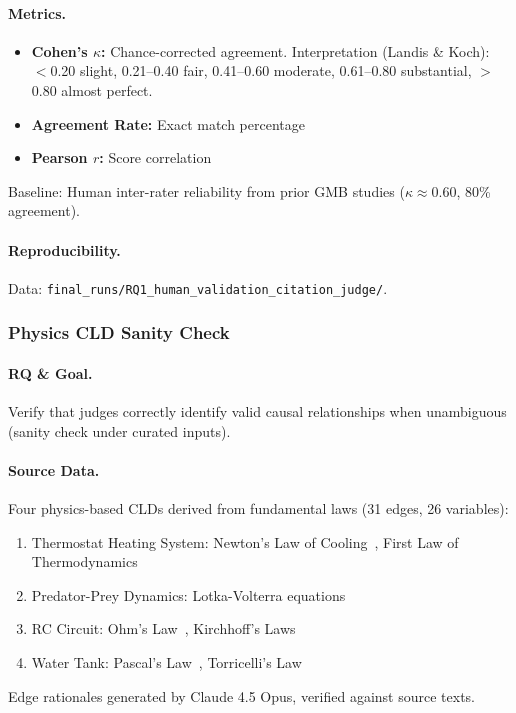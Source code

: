 \paragraph{Metrics.}
\begin{itemize}[noitemsep]
    \item \textbf{Cohen's $\kappa$:} Chance-corrected agreement. Interpretation (Landis \& Koch): $<$0.20 slight, 0.21--0.40 fair, 0.41--0.60 moderate, 0.61--0.80 substantial, $>$0.80 almost perfect.
    \item \textbf{Agreement Rate:} Exact match percentage
    \item \textbf{Pearson $r$:} Score correlation
\end{itemize}
Baseline: Human inter-rater reliability from prior GMB studies ($\kappa \approx 0.60$, 80\% agreement).

\paragraph{Reproducibility.}
Data: \texttt{final\_runs/RQ1\_human\_validation\_citation\_judge/}.

\subsubsection{Physics CLD Sanity Check}
\label{sec:physics_validation}

\paragraph{RQ \& Goal.}
Verify that judges correctly identify valid causal relationships when unambiguous (sanity check under curated inputs).

\paragraph{Source Data.}
Four physics-based CLDs derived from fundamental laws (31 edges, 26 variables):
\begin{enumerate}[noitemsep]
    \item Thermostat Heating System: Newton's Law of Cooling~\cite{newton1701scala}, First Law of Thermodynamics~\cite{clausius1850heat}
    \item Predator-Prey Dynamics: Lotka-Volterra equations~\cite{lotka1925elements,volterra1928fluctuations}
    \item RC Circuit: Ohm's Law~\cite{ohm1827galvanische}, Kirchhoff's Laws~\cite{kirchhoff1845durchgang}
    \item Water Tank: Pascal's Law~\cite{pascal1663equilibre}, Torricelli's Law~\cite{torricelli1644opera}
\end{enumerate}
Edge rationales generated by Claude 4.5 Opus, verified against source texts.

